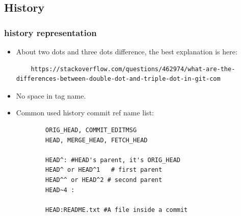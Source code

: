 \documentclass[a4paper,11pt,twoside]{book}
\begin{document}
\subsection{History}
\subsubsection{history representation}
\begin{itemize}
	
	\item About two dots and three dots difference, the best explanation is here:
\begin{lstlisting}
	https://stackoverflow.com/questions/462974/what-are-the-differences-between-double-dot-and-triple-dot-in-git-com
\end{lstlisting}
	\item No space in tag name.
	\item Common used history commit ref name list: 
	\begin{verbatim}
		ORIG_HEAD, COMMIT_EDITMSG
		HEAD, MERGE_HEAD, FETCH_HEAD
		
		HEAD^: #HEAD's parent, it's ORIG_HEAD
		HEAD^ or HEAD^1   # first parent
		HEAD^^ or HEAD^2 # second parent
		HEAD~4 : 
		
		HEAD:README.txt #A file inside a commit
	\end{verbatim}
\end{itemize}
\end{document}
